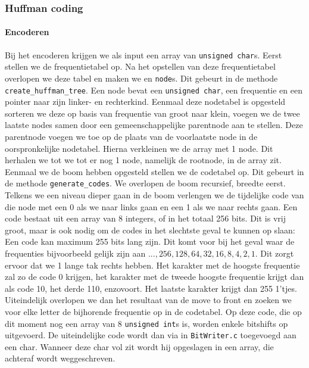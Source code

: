 \documentclass[11pt,a4paper]{article}
\begin{document}
\subsubsection{Huffman coding}
\paragraph*{Encoderen}
Bij het encoderen krijgen we als input een array van \texttt{unsigned char}s. Eerst stellen we de frequentietabel op. Na het opstellen van deze frequentietabel overlopen we deze tabel en maken we en \texttt{node}s. Dit gebeurt in de methode \texttt{create\_huffman\_tree}. Een node bevat een \texttt{unsigned char}, een frequentie en een pointer naar zijn linker- en rechterkind. Eenmaal deze nodetabel is opgesteld sorteren we deze op basis van frequentie van groot naar klein, voegen we de twee laatste nodes samen door een gemeenschappelijke parentnode aan te stellen. Deze parentnode voegen we toe op de plaats van de voorlaatste node in de oorspronkelijke nodetabel. Hierna verkleinen we de array met 1 node. Dit herhalen we tot we tot er nog 1 node, namelijk de rootnode, in de array zit.\\
Eenmaal we de boom hebben opgesteld stellen we de codetabel op. Dit gebeurt in de methode \texttt{generate\_codes}. We overlopen de boom recursief, breedte eerst. Telkens we een niveau dieper gaan in de boom verlengen we de tijdelijke code van die node met een 0 als we naar links gaan en een 1 als we naar rechts gaan. Een code bestaat uit een array van 8 integers, of in het totaal 256 bits. Dit is vrij groot, maar is ook nodig om de codes in het slechtste geval te kunnen op slaan: Een code kan maximum 255 bits lang zijn. Dit komt voor bij het geval waar de frequenties bijvoorbeeld gelijk zijn aan ${...,256,128,64,32,16,8,4,2,1}$. Dit zorgt ervoor dat we 1 lange tak rechts hebben. Het karakter met de hoogste frequentie zal zo de code 0 krijgen, het karakter met de tweede hoogste frequentie krijgt dan als code 10, het derde 110, enzovoort. Het laatste karakter krijgt dan 255 1'tjes.\\
Uiteindelijk overlopen we dan het resultaat van de move to front en zoeken we voor elke letter de bijhorende frequentie op in de codetabel. Op deze code, die op dit moment nog een array van 8 \texttt{unsigned int}s is, worden enkele bitshifts op uitgevoerd. De uiteindelijke code wordt dan via in \texttt{BitWriter.c} toegevoegd aan een char. Wanneer deze char vol zit wordt hij opgeslagen in een array, die achteraf wordt weggeschreven.
\end{document}
